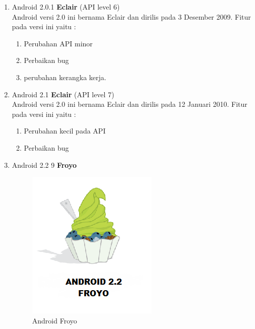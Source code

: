 \begin{enumerate}
\item Android 2.0.1 \textbf{Eclair} (API level 6)\\
Android versi 2.0 ini bernama Eclair dan dirilis pada 3 Desember 2009. Fitur pada versi ini yaitu :
\begin{enumerate}
    \item Perubahan API minor
    \item Perbaikan bug
    \item perubahan kerangka kerja.
\end{enumerate}

\item Android 2.1 \textbf{Eclair} (API level 7)\\
Android versi 2.0 ini bernama Eclair dan dirilis pada 12 Januari 2010. Fitur pada versi ini yaitu :
\begin{enumerate}
    \item Perubahan kecil pada API 
    \item Perbaikan bug
\end{enumerate}

\item Android 2.2 9 \textbf{Froyo}\\
\begin{figure}[!htbp]
    \centering
    \includegraphics[scale = 0.45]{pictures/android-froyo.png}
    \caption{Android Froyo}
    \label{}
\end{figure}


\end{enumerate}
